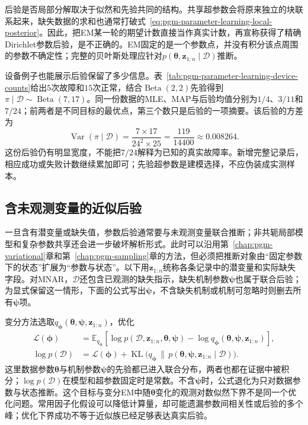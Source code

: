 后验是否局部分解取决于似然和先验共同的结构。共享超参数会将原来独立的块联系起来，缺失数据的求和也通常打破式~\eqref{eq:pgm-parameter-learning-local-posterior}。因此，把EM某一轮的期望计数直接当作真实计数，再宣称获得了精确Dirichlet参数后验，是不正确的。EM固定的是一个参数点，并没有积分该点周围的参数不确定性；完整的贝叶斯处理应针对$p(\bm{\theta},\bm{z}_{1:n}\mid\mathcal{D})$推断。

设备例子也能展示后验保留了多少信息。表~\ref{tab:pgm-parameter-learning-device-counts}给出$5$次故障和$15$次正常，结合$\operatorname{Beta}(2,2)$先验得到$\pi\mid\mathcal{D}\sim\operatorname{Beta}(7,17)$。同一份数据的MLE、MAP与后验均值分别为$1/4$、$3/11$和$7/24$；前两者是不同目标的最优点，第三个数只是后验的一项摘要。该后验的方差为
\[
  \operatorname{Var}(\pi\mid\mathcal{D})
   =\frac{7\times17}{24^2\times25}
   =\frac{119}{14400}\approx0.008264.
\]
这份后验仍有明显宽度，不能把$7/24$解释为已知的真实故障率。新增完整记录后，相应成功或失败计数继续累加即可；先验超参数是建模选择，不应伪装成实测样本。

\subsection{含未观测变量的近似后验}
\label{sec:pgm-parameter-learning-approximate-posterior}

一旦含有潜变量或缺失值，参数后验通常要与未观测变量联合推断；非共轭局部模型和复杂参数共享还会进一步破坏解析形式。此时可以沿用第~\ref{chap:pgm-variational}章和第~\ref{chap:pgm-sampling}章的方法，但必须把推断对象由“固定参数下的状态”扩展为“参数与状态”。以下用$\bm{z}_{1:n}$统称各条记录中的潜变量和实际缺失字段。对MNAR，$\mathcal{D}$还包含已观测的缺失指示，缺失机制参数$\bm{\psi}$也属于联合后验；为显式保留这一情形，下面的公式写出$\bm{\psi}$，不含缺失机制或机制可忽略时则删去所有$\bm{\psi}$项。

变分方法选取$q_{\bm{\phi}}(\bm{\theta},\bm{\psi},\bm{z}_{1:n})$，优化
\begin{equation}
  \begin{aligned}
    \mathcal{L}(\bm{\phi})
      &=\mathbb{E}_{q_{\bm{\phi}}}
       [\log p(\mathcal{D},\bm{z}_{1:n},\bm{\theta},\bm{\psi})
        -\log q_{\bm{\phi}}
          (\bm{\theta},\bm{\psi},\bm{z}_{1:n})],\\
    \log p(\mathcal{D})
      &=\mathcal{L}(\bm{\phi})
        +\operatorname{KL}\bigl(
          q_{\bm{\phi}}\,\|\,
          p(\bm{\theta},\bm{\psi},\bm{z}_{1:n}\mid\mathcal{D})
        \bigr).
  \end{aligned}
  \label{eq:pgm-parameter-learning-bayesian-elbo}
\end{equation}
这里数据参数$\bm{\theta}$与机制参数$\bm{\psi}$的先验都已进入联合分布，两者也都在证据中被积分；$\log p(\mathcal{D})$在模型和超参数固定时是常数。不含$\bm{\psi}$时，公式退化为只对数据参数与状态推断。这个目标与变分EM中随$\bm{\theta}$变化的观测对数似然下界不是同一个优化问题。常用因子化假设可以降低计算量，却可能遗漏参数间相关性或后验的多个峰；优化下界成功不等于近似族已经足够表达真实后验。

